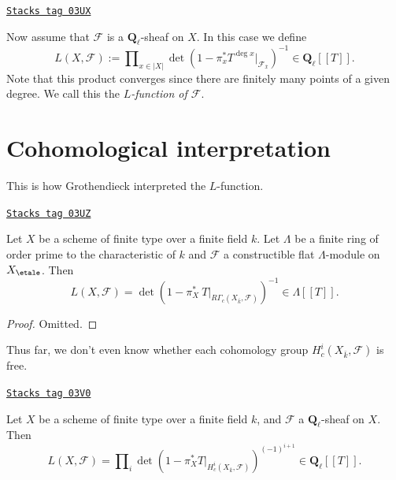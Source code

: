 \begin{definition}
\label{trace-definition-L-function-l-adic}
\href{https://stacks.math.columbia.edu/tag/03UX}{\texttt{Stacks tag 03UX}}

Now assume that $\mathcal{F}$ is a $\mathbf{Q}_\ell$-sheaf on $X$.
In this case we define
$$
L(X, \mathcal{F}) :=
\prod\nolimits_{x \in |X|}
\det(1 - \pi_x^*T^{\deg x} |_{\mathcal{F}_{\bar x}})^{-1}
\in \mathbf{Q}_\ell[[T]].
$$
Note that this product converges since there are finitely many points of a
given degree. We call this the {\it $L$-function of
$\mathcal{F}$}.
\end{definition}

\section{Cohomological interpretation}
\label{trace-section-L-cohomological}
This is how Grothendieck interpreted the $L$-function.

\begin{theorem}

\label{trace-theorem-A}
\href{https://stacks.math.columbia.edu/tag/03UZ}{\texttt{Stacks tag 03UZ}}

Let $X$ be a scheme of finite type over a finite field $k$. Let $\Lambda$ be a
finite ring of order prime to the characteristic of $k$ and $\mathcal{F}$ a
constructible flat $\Lambda$-module on $X_\etale$. Then
$$
L(X, \mathcal{F}) =
\det(1 - \pi_X^*\ T |_{R\Gamma_c(X_{\bar k}, \mathcal{F})})^{-1}
\in \Lambda[[T]].
$$
\end{theorem}

\begin{proof}
Omitted.
\end{proof}

Thus far, we don't even know whether each cohomology group
$H^i_c(X_{\bar k}, \mathcal{F})$ is free.

\begin{theorem}

\label{trace-theorem-B}
\href{https://stacks.math.columbia.edu/tag/03V0}{\texttt{Stacks tag 03V0}}

Let $X$ be a scheme of finite type over a finite field $k$, and $\mathcal{F}$ a
$\mathbf{Q}_\ell$-sheaf on $X$. Then
$$
L(X, \mathcal{F}) =
\prod\nolimits_i
\det(1 - \pi_X^*T |_{H_c^i(X_{\bar k} , \mathcal{F})})^{(-1)^{i + 1}}
\in \mathbf{Q}_\ell[[T]].
$$
\end{theorem}

